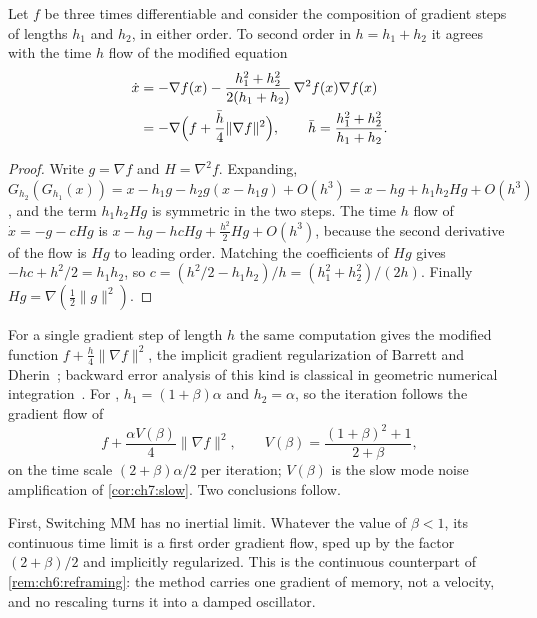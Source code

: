 \begin{proposition}\label{prop:ch5b:modified}
Let $f$ be three times differentiable and consider the composition of gradient
steps of lengths $h_1$ and $h_2$, in either order. To second order in
$h=h_1+h_2$ it agrees with the time $h$ flow of the modified equation
\begin{equation}\label{eq:ch5b:modified}
\begin{aligned}
  \dot x&=-\nabla f(x)-\frac{h_1^2+h_2^2}{2(h_1+h_2)}\,\nabla^2f(x)\nabla f(x)\\
  &=-\nabla\Bigl(f+\frac{\bar h}{4}\|\nabla f\|^2\Bigr),\qquad
  \bar h=\frac{h_1^2+h_2^2}{h_1+h_2}.
\end{aligned}
\end{equation}
\end{proposition}

\begin{proof}
Write $g=\nabla f$ and $H=\nabla^2f$. Expanding,
$G_{h_2}(G_{h_1}(x))=x-h_1g-h_2g(x-h_1g)+O(h^3)=x-hg+h_1h_2Hg+O(h^3)$, and the
term $h_1h_2Hg$ is symmetric in the two steps. The time $h$ flow of
$\dot x=-g-cHg$ is $x-hg-hcHg+\frac{h^2}2Hg+O(h^3)$, because the second
derivative of the flow is $Hg$ to leading order. Matching the coefficients of
$Hg$ gives $-hc+h^2/2=h_1h_2$, so $c=(h^2/2-h_1h_2)/h=(h_1^2+h_2^2)/(2h)$. Finally
$Hg=\nabla(\frac12\|g\|^2)$.
\end{proof}

For a single gradient step of length $h$ the same computation gives the
modified function $f+\frac h4\|\nabla f\|^2$, the implicit gradient
regularization of Barrett and Dherin~\cite{barrett2021}; backward error analysis
of this kind is classical in geometric numerical
integration~\cite{hairer2006}. For \smmdet, $h_1=(1+\beta)\alpha$ and
$h_2=\alpha$, so the iteration follows the gradient flow of
\[
  f+\frac{\alpha V(\beta)}{4}\|\nabla f\|^2,\qquad
  V(\beta)=\frac{(1+\beta)^2+1}{2+\beta},
\]
on the time scale $(2+\beta)\alpha/2$ per iteration; $V(\beta)$ is the slow mode noise amplification of \cref{cor:ch7:slow}. Two conclusions follow.

First, Switching MM has no inertial limit. Whatever the value of $\beta<1$, its
continuous time limit is a first order gradient flow, sped up by the factor
$(2+\beta)/2$ and implicitly regularized. This is the continuous counterpart of
\cref{rem:ch6:reframing}: the method carries one gradient of memory, not a
velocity, and no rescaling turns it into a damped oscillator.

